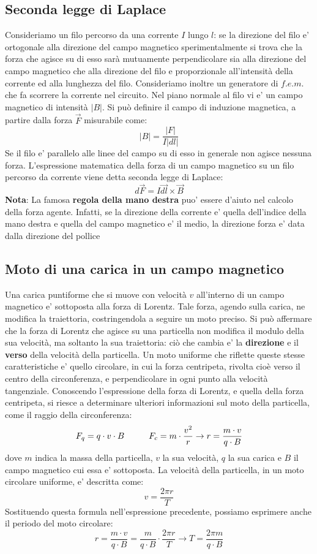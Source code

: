 \documentclass[a4paper, 10pt]{article}
\begin{document}
		\subsection{Seconda legge di Laplace}
			Consideriamo un filo percorso da una corrente $I$ lungo $l$: se la direzione del filo e' ortogonale alla direzione del
			campo magnetico sperimentalmente si trova che la forza che agisce su di esso sarà mutuamente perpendicolare sia alla
			direzione del campo magnetico che alla direzione del filo e proporzionale all'intensità della corrente 
			ed alla lunghezza del filo. Consideriamo inoltre un generatore di $f.e.m.$ che fa scorrere la corrente nel 
			circuito. Nel piano normale al filo vi e' un campo magnetico di intensità $\vert B \vert$. Si può definire
			il campo di induzione magnetica, a partire dalla forza $\overrightarrow{F}$ misurabile come:
			\[ \vert B \vert = \frac{\vert F \vert}{I \vert dl \vert} \] 
			Se il filo e' parallelo alle linee del campo su di esso in generale non agisce nessuna forza. L'espressione 
			matematica della forza di un campo magnetico su un filo percorso da corrente viene detta seconda legge di Laplace:
			\[ d\overrightarrow{F} = I \overrightarrow{dl} \times \overrightarrow{B} \]
			\textbf{Nota}: La famosa \textbf{regola della mano destra} puo' essere d'aiuto nel calcolo della forza agente. 
			Infatti, se la direzione della corrente e' quella dell'indice della mano destra e quella del campo magnetico e' 
			il medio, la direzione forza e' data dalla direzione del pollice
		\subsection{Moto di una carica in un campo magnetico}
			Una carica puntiforme che si muove con velocità $v$ all'interno di un campo magnetico e' sottoposta alla forza
			di Lorentz. Tale forza, agendo sulla carica, ne modifica la traiettoria, costringendola a seguire un moto preciso.
			Si può affermare che la forza di Lorentz che agisce su una particella non modifica il modulo della sua velocità, ma
			soltanto la sua traiettoria: ciò che cambia e' la \textbf{direzione} e il \textbf{verso} della velocità 
			della particella. Un moto uniforme che riflette queste stesse caratteristiche e' quello circolare, in cui la 
			forza centripeta, rivolta cioè verso il centro della circonferenza, e perpendicolare in ogni punto alla velocità
			tangenziale. Conoscendo l'espressione della forza di Lorentz, e quella della forza centripeta, si riesce a determinare
			ulteriori informazioni sul moto della particella, come il raggio della circonferenza:
			\[ F_q = q \cdot v \cdot B  \hspace{1.0cm} F_c = m \cdot \frac{v^2}{r} \rightarrow r = \frac{m \cdot v}{q \cdot B} \]
			dove $m$ indica la massa della particella, $v$ la sua velocità, $q$ la sua carica e $B$ il campo magnetico cui essa
			e' sottoposta. La velocità della particella, in un moto circolare uniforme, e' descritta come:
			\[ v = \frac{2\pi r}{T} \]
			Sostituendo questa formula nell'espressione precedente, possiamo esprimere anche il periodo del moto circolare:
			\[ r = \frac{m \cdot v}{q \cdot B} = \frac{m}{q \cdot B} \cdot \frac{2\pi r}{T}
			\rightarrow T = \frac{2\pi m}{q \cdot B} \]
\end{document}
